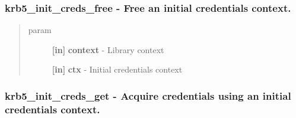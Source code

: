 \documentclass[letterpaper,10pt,english]{sphinxmanual}
\begin{document}
\subsubsection{krb5\_init\_creds\_free -  Free an initial credentials context.}
\label{appdev/refs/api/krb5_init_creds_free::doc}\label{appdev/refs/api/krb5_init_creds_free:krb5-init-creds-free-free-an-initial-credentials-context}

\begin{fulllineitems}
\label{appdev/refs/api/krb5_init_creds_free:krb5_init_creds_free}
\end{fulllineitems}

\begin{quote}\begin{description}
\item[{param}] \leavevmode
\textbf{{[}in{]}} \textbf{context} - Library context

\textbf{{[}in{]}} \textbf{ctx} - Initial credentials context

\end{description}\end{quote}


\subsubsection{krb5\_init\_creds\_get -  Acquire credentials using an initial credentials context.}
\label{appdev/refs/api/krb5_init_creds_get::doc}\label{appdev/refs/api/krb5_init_creds_get:krb5-init-creds-get-acquire-credentials-using-an-initial-credentials-context}

\begin{fulllineitems}
\label{appdev/refs/api/krb5_init_creds_get:krb5_init_creds_get}
\end{fulllineitems}
\end{document}

